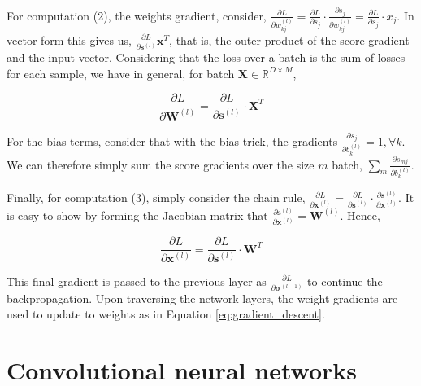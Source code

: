 For computation (2), the weights gradient, consider, $\frac{\partial L}{\partial w_{kj}^{(l)}} = \frac{\partial L}{\partial s_j}\cdot\frac{\partial s_j}{\partial w_{kj}^{(l)}} = \frac{\partial L}{\partial s_j}\cdot x_j$. In vector form this gives us, $\frac{\partial L}{\partial \mathbf{s}^{(l)}}\mathbf{x}^T$, that is, the outer product of the score gradient and the input vector. Considering that the loss over a batch is the sum of losses for each sample, we have in general, for batch $\mathbf{X} \in \mathbb{R}^{D \times M}$,

\begin{equation}
\frac{\partial L}{\partial \mathbf{W}^{(l)}} = \frac{\partial L}{\partial \mathbf{s}^{(l)}}\cdot\mathbf{X}^T
\label{eq:backprop_weights}
\end{equation}

For the bias terms, consider that with the bias trick, the gradients $\frac{\partial s_j}{\partial b_{k}^{(l)}} = 1, \forall k$. We can therefore simply sum the score gradients over the size $m$ batch, $\sum_m\frac{\partial s_{mj}}{\partial b_{k}^{(l)}}$. 

Finally, for computation (3), simply consider the chain rule, $\frac{\partial L}{\partial\mathbf{x}^{(l)}} = \frac{\partial L}{\partial\mathbf{s}^{(l)}}\cdot\frac{\partial\mathbf{s}^{(l)}}{\partial\mathbf{x}^{(l)}}.$ It is easy to show by forming the Jacobian matrix that $\frac{\partial\mathbf{s}^{(l)}}{\partial\mathbf{x}^{(l)}} = \mathbf{W}^{(l)}$. Hence,

\begin{equation}
\frac{\partial L}{\partial \mathbf{x}^{(l)}} = \frac{\partial L}{\partial \mathbf{s}^{(l)}}\cdot\mathbf{W}^T
\label{eq:backprop_activations}
\end{equation}

This final gradient is passed to the previous layer as $\frac{\partial L}{\partial \boldsymbol{\sigma}^{(l-1)}}$ to continue the backpropagation. Upon traversing the network layers, the weight gradients are used to update to weights as in Equation \ref{eq:gradient_descent}.

\section{Convolutional neural networks}
\label{sec:convolutional_neural_networks}


